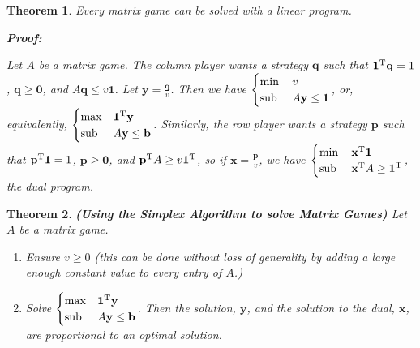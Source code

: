 \documentclass{article}
\theoremstyle{colontheorem}
\newtheorem{theorem}{Theorem}[section]
\newcommand{\T}{^\textnormal{T}}
\newcommand{\Sub}{\textnormal{sub }}
\newenvironment{Theorem}
{
	\begin{mdframed}[backgroundcolor=TheoremOrange!10]
	\begin{theorem}
}
{
	\end{theorem}
	\end{mdframed}
	
	\vspace{.15in}
}
\newenvironment{Proof}
{
	\begin{mdframed}[backgroundcolor=ProofPurple!10]
	\textbf{Proof:}%
}
{
	\end{mdframed}
	
	\vspace{.085in}
}
\begin{document}
\begin{Theorem}
	
	Every matrix game can be solved with a linear program.
	
	\begin{Proof}
		Let $A$ be a matrix game. The column player wants a strategy $\mathbf{q}$ such that $\mathbf{1}\T \mathbf{q} = 1$, $\mathbf{q} \geq \mathbf{0}$, and $A \mathbf{q} \leq v \mathbf{1}$. Let $\mathbf{y} = \frac{\mathbf{q}}{v}$. Then we have $
		\begin{cases}
		\min & v\\
		\Sub & A \mathbf{y} \leq \mathbf{1}
		\end{cases}$, or, equivalently, $
		\begin{cases}
		\max & \mathbf{1}\T \mathbf{y}\\
		\Sub & A \mathbf{y} \leq \mathbf{b}
		\end{cases}$. Similarly, the row player wants a strategy $\mathbf{p}$ such that $\mathbf{p}\T \mathbf{1} = 1$, $\mathbf{p} \geq \mathbf{0}$, and $\mathbf{p}\T A \geq v \mathbf{1}\T$, so if $\mathbf{x} = \frac{\mathbf{p}}{v}$, we have $
		\begin{cases}
		\min & \mathbf{x}\T \mathbf{1}\\
		\Sub & \mathbf{x}\T A \geq \mathbf{1}\T
		\end{cases}$, the dual program.
		
	\end{Proof}
	
\end{Theorem}



\begin{Theorem}
	
	\textbf{(Using the Simplex Algorithm to solve Matrix Games)} Let $A$ be a matrix game.
	
	\begin{enumerate}
		
		\item Ensure $v \geq 0$ (this can be done without loss of generality by adding a large enough constant value to every entry of $A$.)
		
		\item Solve $
		\begin{cases}
		\max & \mathbf{1}\T \mathbf{y}\\
		\Sub & A \mathbf{y} \leq \mathbf{b}
		\end{cases}$. Then the solution, $\mathbf{y}$, and the solution to the dual, $\mathbf{x}$, are \textit{proportional} to an optimal solution.
		
	\end{enumerate}
	
\end{Theorem}
\end{document}
